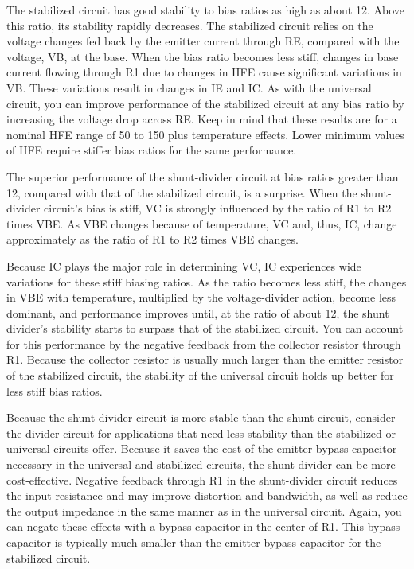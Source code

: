 \bigskip

The stabilized circuit has good stability to bias ratios as high as about 12. Above this ratio, its stability rapidly decreases. The stabilized circuit relies on the voltage changes fed back by the emitter current through RE, compared with the voltage, VB, at the base. When the bias ratio becomes less stiff, changes in base current flowing through R1 due to changes in HFE cause significant variations in VB. These variations result in changes in IE and IC. As with the universal circuit, you can improve performance of the stabilized circuit at any bias ratio by increasing the voltage drop across RE. Keep in mind that these results are for a nominal HFE range of 50 to 150 plus temperature effects. Lower minimum values of HFE require stiffer bias ratios for the same performance.

\bigskip

The superior performance of the shunt-divider circuit at bias ratios greater than 12, compared with that of the stabilized circuit, is a surprise. When the shunt-divider circuit's bias is stiff, VC is strongly influenced by the ratio of R1 to R2 times VBE. As VBE changes because of temperature, VC and, thus, IC, change approximately as the ratio of R1 to R2 times VBE changes.

\bigskip
Because IC plays the major role in determining VC, IC experiences wide variations for these stiff biasing ratios. As the ratio becomes less stiff, the changes in VBE with temperature, multiplied by the voltage-divider action, become less dominant, and performance improves until, at the ratio of about 12, the shunt divider's stability starts to surpass that of the stabilized circuit. You can account for this performance by the negative feedback from the collector resistor through R1. Because the collector resistor is usually much larger than the emitter resistor of the stabilized circuit, the stability of the universal circuit holds up better for less stiff bias ratios.

\bigskip
Because the shunt-divider circuit is more stable than the shunt circuit, consider the divider circuit for applications that need less stability than the stabilized or universal circuits offer. Because it saves the cost of the emitter-bypass capacitor necessary in the universal and stabilized circuits, the shunt divider can be more cost-effective. Negative feedback through R1 in the shunt-divider circuit reduces the input resistance and may improve distortion and bandwidth, as well as reduce the output impedance in the same manner as in the universal circuit. Again, you can negate these effects with a bypass capacitor in the center of R1. This bypass capacitor is typically much smaller than the emitter-bypass capacitor for the stabilized circuit.

